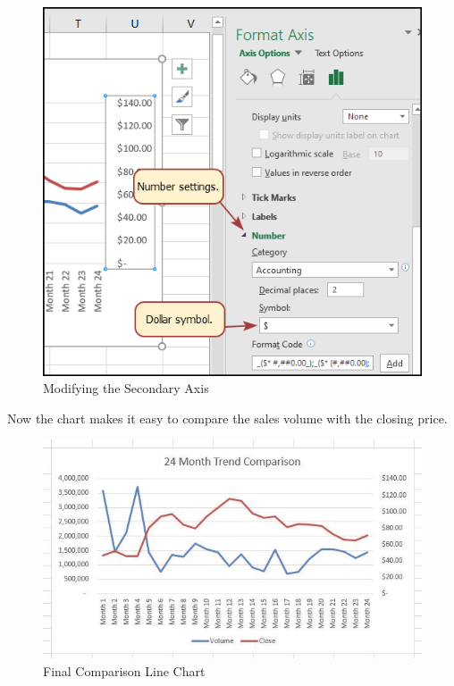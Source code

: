 \begin{figure}[H]
	\centering
	\includegraphics[width=\maxwidth{.75\linewidth}]{gfx/ch04_fig09}
	\caption{Modifying the Secondary Axis}
	\label{04:fig09}
\end{figure}

Now the chart makes it easy to compare the sales volume with the closing price.

\begin{figure}[H]
	\centering
	\includegraphics[width=\maxwidth{.95\linewidth}]{gfx/ch04_fig10}
	\caption{Final Comparison Line Chart}
	\label{04:fig10}
\end{figure}

